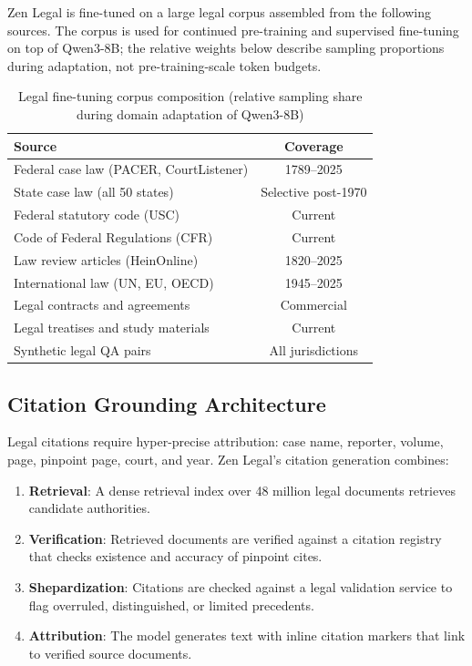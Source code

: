 \documentclass[11pt,a4paper]{article}
\begin{document}
Zen Legal is fine-tuned on a large legal corpus assembled from the following sources. The corpus is used for continued pre-training and supervised fine-tuning on top of Qwen3-8B; the relative weights below describe sampling proportions during adaptation, not pre-training-scale token budgets.

\begin{table}[H]
\centering
\caption{Legal fine-tuning corpus composition (relative sampling share during domain adaptation of Qwen3-8B)}
\label{tab:corpus}
\begin{tabular}{lc}
\toprule
Source & Coverage \\
\midrule
Federal case law (PACER, CourtListener) & 1789--2025 \\
State case law (all 50 states) & Selective post-1970 \\
Federal statutory code (USC) & Current \\
Code of Federal Regulations (CFR) & Current \\
Law review articles (HeinOnline) & 1820--2025 \\
International law (UN, EU, OECD) & 1945--2025 \\
Legal contracts and agreements & Commercial \\
Legal treatises and study materials & Current \\
Synthetic legal QA pairs & All jurisdictions \\
\bottomrule
\end{tabular}
\end{table}

\subsection{Citation Grounding Architecture}

Legal citations require hyper-precise attribution: case name, reporter, volume, page, pinpoint page, court, and year. Zen Legal's citation generation combines:

\begin{enumerate}
  \item \textbf{Retrieval}: A dense retrieval index over 48 million legal documents retrieves candidate authorities.
  \item \textbf{Verification}: Retrieved documents are verified against a citation registry that checks existence and accuracy of pinpoint cites.
  \item \textbf{Shepardization}: Citations are checked against a legal validation service to flag overruled, distinguished, or limited precedents.
  \item \textbf{Attribution}: The model generates text with inline citation markers that link to verified source documents.
\end{enumerate}
\end{document}
